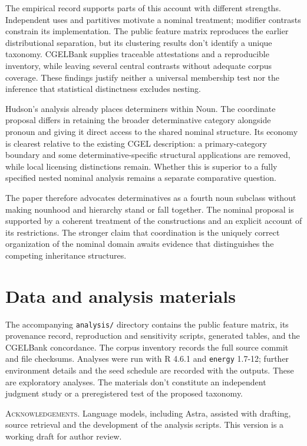 \documentclass[12pt]{article}
\begin{document}
The empirical record supports parts of this account with different strengths. Independent uses and partitives motivate a nominal treatment; modifier contrasts constrain its implementation. The public feature matrix reproduces the earlier distributional separation, but its clustering results don't identify a unique taxonomy. CGELBank supplies traceable attestations and a reproducible inventory, while leaving several central contrasts without adequate corpus coverage. These findings justify neither a universal membership test nor the inference that statistical distinctness excludes nesting.

Hudson's analysis already places determiners within Noun. The coordinate proposal differs in retaining the broader determinative category alongside pronoun and giving it direct access to the shared nominal structure. Its economy is clearest relative to the existing CGEL description: a primary-category boundary and some determinative-specific structural applications are removed, while local licensing distinctions remain. Whether this is superior to a fully specified nested nominal analysis remains a separate comparative question.

The paper therefore advocates determinatives as a fourth noun subclass without making nounhood and hierarchy stand or fall together. The nominal proposal is supported by a coherent treatment of the constructions and an explicit account of its restrictions. The stronger claim that coordination is the uniquely correct organization of the nominal domain awaits evidence that distinguishes the competing inheritance structures.

\section*{Data and analysis materials}

The accompanying \texttt{analysis/} directory contains the public feature matrix, its provenance record, reproduction and sensitivity scripts, generated tables, and the CGELBank concordance. The corpus inventory records the full source commit and file checksums. Analyses were run with R 4.6.1 and \texttt{energy} 1.7-12; further environment details and the seed schedule are recorded with the outputs. These are exploratory analyses. The materials don't constitute an independent judgment study or a preregistered test of the proposed taxonomy.

\vspace{0.5\baselineskip}
\noindent\textsc{Acknowledgements.} Language models, including Astra, assisted with drafting, source retrieval and the development of the analysis scripts. This version is a working draft for author review.

\clearpage
\printbibliography
\end{document}
